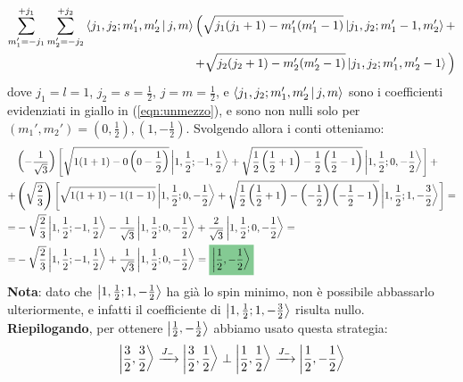 \documentclass[../../FisicaTeorica.tex]{subfiles}
\begin{document}
\begin{enumerate}
\begin{align*}
\sum_{m_1' = -j_1}^{+j_1} \sum_{m_2' = -j_2}^{+j_2} \Braket{j_1, j_2; m_1', m_2'|j,m} \Big ( \sqrt{j_1(j_1+1)-m_1'(m_1'-1)} \Ket{j_1, j_2; m_1'-1, m_2'} +\\
+\sqrt{j_2(j_2+1)-m_2'(m_2'-1)}\Ket{j_1, j_2; m_1', m_2'-1} \Big)
\end{align*}
dove $j_1 = l = 1$, $j_2 = s = \frac{1}{2}$, $j=m=\frac{1}{2}$, e $\Braket{j_1, j_2; m_1', m_2'|j,m}$ sono i coefficienti evidenziati in giallo in (\ref{eqn:unmezzo}), e sono non nulli solo per $(m_1', m_2') = (0,\frac{1}{2}), (1,-\frac{1}{2})$. Svolgendo allora i conti otteniamo:
\begin{align} \nonumber
&\left(-\frac{1}{\sqrt{3}}\right)\left[\sqrt{1(1+1)-0\left(0-\frac{1}{2}\right)}\ket{1,\frac{1}{2};-1,\frac{1}{2}}+ \sqrt{\frac{1}{2}\left(\frac{1}{2}+1\right)-\frac{1}{2}\left(\frac{1}{2}-1\right)}\ket{1,\frac{1}{2};0,-\frac{1}{2}} \right] +\\ \nonumber
+&\left(\sqrt{\frac{2}{3}}\right)\left[\sqrt{1(1+1)-1(1-1)} \ket{1,\frac{1}{2};0,-\frac{1}{2}}+\sqrt{\frac{1}{2}\left(\frac{1}{2}+1\right)-\left(-\frac{1}{2}\right)\left( -\frac{1}{2}-1\right)}\ket{1,\frac{1}{2};1,-\frac{3}{2}} \right]=\\ \nonumber
=&
-\sqrt{\frac{2}{3}}\ket{1,\frac{1}{2};-1,\frac{1}{2}} -\frac{1}{\sqrt{3}}\ket{1,\frac{1}{2};0,-\frac{1}{2}} + \frac{2}{\sqrt{3}}\ket{1,\frac{1}{2};0,-\frac{1}{2}}=\\ \label{eqn:ket-finale}
=& -\sqrt{\frac{2}{3}}\ket{1,\frac{1}{2};-1,\frac{1}{2}}+\frac{1}{\sqrt{3}}\ket{1,\frac{1}{2};0,-\frac{1}{2}} = \hlc{ForestGreen}{\ket{\frac{1}{2},-\frac{1}{2}}}
\end{align}
\textbf{Nota}: dato che $\Ket{1,\frac{1}{2};1,-\frac{1}{2}}$ ha già lo spin minimo, non è possibile abbassarlo ulteriormente, e infatti il coefficiente di $\Ket{1,\frac{1}{2};1,-\frac{3}{2}}$ risulta nullo.\\

\textbf{Riepilogando}, per ottenere $\Ket{\frac{1}{2},-\frac{1}{2}}$ abbiamo usato questa strategia:
\[
\Ket{\frac{3}{2}, \frac{3}{2}} \xrightarrow{J_-} \Ket{\frac{3}{2},\frac{1}{2}} \perp \Ket{\frac{1}{2},\frac{1}{2}} \xrightarrow{J_-} \Ket{\frac{1}{2},-\frac{1}{2}}
\]


\end{enumerate}
\end{document}
